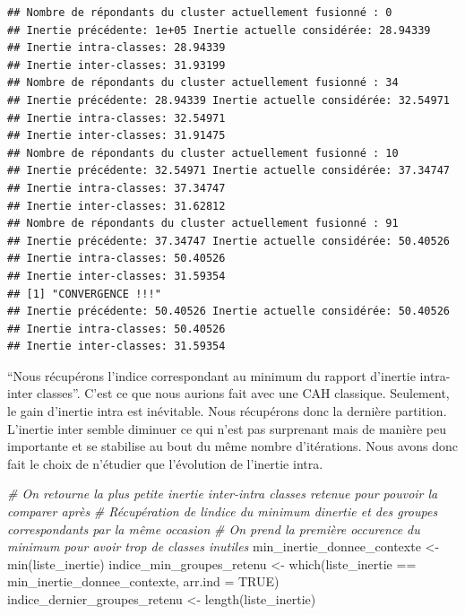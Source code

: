 \documentclass[
]{article}
\newenvironment{Shaded}{\begin{snugshade}}{\end{snugshade}}
\newcommand{\AttributeTok}[1]{\textcolor[rgb]{0.77,0.63,0.00}{#1}}
\newcommand{\CommentTok}[1]{\textcolor[rgb]{0.56,0.35,0.01}{\textit{#1}}}
\newcommand{\ConstantTok}[1]{\textcolor[rgb]{0.00,0.00,0.00}{#1}}
\newcommand{\FunctionTok}[1]{\textcolor[rgb]{0.00,0.00,0.00}{#1}}
\newcommand{\NormalTok}[1]{#1}
\newcommand{\OtherTok}[1]{\textcolor[rgb]{0.56,0.35,0.01}{#1}}
\newcommand{\SpecialCharTok}[1]{\textcolor[rgb]{0.00,0.00,0.00}{#1}}
\begin{document}
\begin{verbatim}
## Nombre de répondants du cluster actuellement fusionné : 0 
## Inertie précédente: 1e+05 Inertie actuelle considérée: 28.94339 
## Inertie intra-classes: 28.94339 
## Inertie inter-classes: 31.93199 
## Nombre de répondants du cluster actuellement fusionné : 34 
## Inertie précédente: 28.94339 Inertie actuelle considérée: 32.54971 
## Inertie intra-classes: 32.54971 
## Inertie inter-classes: 31.91475 
## Nombre de répondants du cluster actuellement fusionné : 10 
## Inertie précédente: 32.54971 Inertie actuelle considérée: 37.34747 
## Inertie intra-classes: 37.34747 
## Inertie inter-classes: 31.62812 
## Nombre de répondants du cluster actuellement fusionné : 91 
## Inertie précédente: 37.34747 Inertie actuelle considérée: 50.40526 
## Inertie intra-classes: 50.40526 
## Inertie inter-classes: 31.59354 
## [1] "CONVERGENCE !!!"
## Inertie précédente: 50.40526 Inertie actuelle considérée: 50.40526 
## Inertie intra-classes: 50.40526 
## Inertie inter-classes: 31.59354
\end{verbatim}

``Nous récupérons l'indice correspondant au minimum du rapport d'inertie
intra-inter classes''. C'est ce que nous aurions fait avec une CAH
classique. Seulement, le gain d'inertie intra est inévitable. Nous
récupérons donc la dernière partition. L'inertie inter semble diminuer
ce qui n'est pas surprenant mais de manière peu importante et se
stabilise au bout du même nombre d'itérations. Nous avons donc fait le
choix de n'étudier que l'évolution de l'inertie intra.

\begin{Shaded}
\begin{Highlighting}[]
\CommentTok{\# On retourne la plus petite inertie inter{-}intra classes retenue pour pouvoir la comparer après}
\CommentTok{\# Récupération de l\textquotesingle{}indice du minimum d\textquotesingle{}inertie et des groupes correspondants par la même occasion}
\CommentTok{\# On prend la première occurence du minimum pour avoir trop de classes inutiles}
\NormalTok{min\_inertie\_donnee\_contexte }\OtherTok{\textless{}{-}} \FunctionTok{min}\NormalTok{(liste\_inertie)}
\NormalTok{indice\_min\_groupes\_retenu }\OtherTok{\textless{}{-}} \FunctionTok{which}\NormalTok{(liste\_inertie }\SpecialCharTok{==}\NormalTok{ min\_inertie\_donnee\_contexte, }\AttributeTok{arr.ind =} \ConstantTok{TRUE}\NormalTok{)}
\NormalTok{indice\_dernier\_groupes\_retenu }\OtherTok{\textless{}{-}} \FunctionTok{length}\NormalTok{(liste\_inertie)}
\end{Highlighting}
\end{Shaded}
\end{document}

